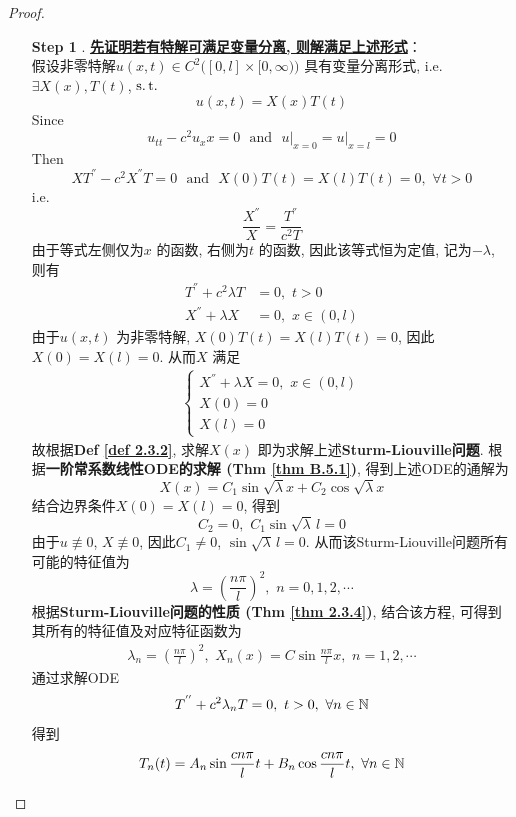 \begin{thm}
\begin{proof}
\begin{itemize}
				\begin{enumerate}
					\item[\textbf{Step 1}]. \underline{\textbf{先证明若有特解可满足变量分离, 则解满足上述形式}}：\\
					假设非零特解$u(x , t) \in C^2\Big( [0 , l] \times [0 , \infty) \Big)$ 具有变量分离形式, i.e. $\exists X(x) , T(t)$, $\operatorname{s.t.}$
					\[ u(x , t) = X(x) T(t) \]
					Since 
					\[ u_{tt} - c^2 u_xx = 0 \,\,\,\, \text{and} \,\,\,\, u\Big|_{x = 0} = u \Big|_{x = l} = 0 \]
					Then 
					\[ XT^{''} - c^2 X^{''}T = 0 \,\,\,\, \text{and} \,\,\,\, X(0) T(t) = X(l)T(t) = 0 , \,\, \forall t > 0 \]
					i.e.
					\[ \frac{X^{''}}{X} = \frac{T^{''}}{c^2 T} \]
					由于等式左侧仅为$x$ 的函数, 右侧为$t$ 的函数, 因此该等式恒为定值, 记为$-\lambda$, 则有
					\begin{align*}
						T^{''} + c^2 \lambda T &= 0 , \,\, t > 0 \\
						X^{''} + \lambda X &= 0 , \,\, x \in (0 , l)
					\end{align*}
					由于$u(x , t)$ 为非零特解, $X(0) T(t) = X(l)T(t) = 0$, 因此$X(0) = X(l) = 0$. 从而$X$ 满足
					\begin{align}
						\begin{cases}
							X^{''} + \lambda X = 0 , \,\, x \in (0 , l) \\
							X(0) = 0 \\
							X(l) = 0
						\end{cases} \label{2.20}
					\end{align}
					故根据\textbf{Def \ref{def 2.3.2}}, 求解$X(x)$ 即为求解上述\textbf{Sturm-Liouville问题}. 根据\textbf{一阶常系数线性ODE的求解 (Thm \ref{thm B.5.1})}, 得到上述ODE的通解为
					\[ X(x) = C_1 \sin \sqrt{\lambda} x + C_2 \cos \sqrt{\lambda} x \]
					结合边界条件$X(0) = X(l) = 0$, 得到
					\[ C_2 = 0 , \,\, C_1 \sin \sqrt{\lambda} \, l = 0 \]
					由于$u \not\equiv 0$, $X \not\equiv 0$, 因此$C_1 \neq 0$, $\sin \sqrt{\lambda} \, l = 0$. 从而该Sturm-Liouville问题所有可能的特征值为
					\[ \lambda = \left( \frac{n\pi}{l} \right)^2 , \,\, n = 0 , 1 , 2 , \cdots \]
					根据\textbf{Sturm-Liouville问题的性质 (Thm \ref{thm 2.3.4})}, 结合该方程, 可得到其所有的特征值及对应特征函数为
					\begin{align*}
						\lambda_n = \left( \frac{n \pi}{l} \right)^2 , \,\, X_n(x) = C \sin \frac{n\pi}{l}x , \,\, n = 1 , 2 , \cdots
					\end{align*}
					通过求解ODE
					\[ T^{''} + c^2 \lambda_n T = 0 , \,\, t > 0 , \,\, \forall n \in \mathbb{N} \]
					得到
					\[ T_n(t) = A_n \sin \frac{cn\pi}{l} t + B_n \cos \frac{cn\pi}{l} t , \,\, \forall n \in \mathbb{N} \]

\end{enumerate}
\end{itemize}
\end{proof}
\end{thm}
